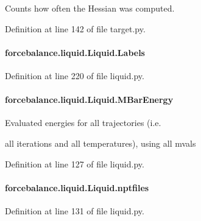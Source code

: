 Counts how often the Hessian was computed. 



Definition at line 142 of file target.\-py.

\hypertarget{classforcebalance_1_1liquid_1_1Liquid_a50f976d2d3d6a1c261756035a26390e2}{
\paragraph[{Labels}]{\setlength{\rightskip}{0pt plus 5cm}forcebalance.\-liquid.\-Liquid.\-Labels}}\label{classforcebalance_1_1liquid_1_1Liquid_a50f976d2d3d6a1c261756035a26390e2}


Definition at line 220 of file liquid.\-py.

\hypertarget{classforcebalance_1_1liquid_1_1Liquid_a6c00a87ae43f535118b77d41af51a5d7}{
\paragraph[{M\-Bar\-Energy}]{\setlength{\rightskip}{0pt plus 5cm}forcebalance.\-liquid.\-Liquid.\-M\-Bar\-Energy}}\label{classforcebalance_1_1liquid_1_1Liquid_a6c00a87ae43f535118b77d41af51a5d7}


Evaluated energies for all trajectories (i.\-e. 

all iterations and all temperatures), using all mvals 

Definition at line 127 of file liquid.\-py.

\hypertarget{classforcebalance_1_1liquid_1_1Liquid_a2030a7e21fcce59155a0258daed4f2f7}{
\paragraph[{nptfiles}]{\setlength{\rightskip}{0pt plus 5cm}forcebalance.\-liquid.\-Liquid.\-nptfiles}}\label{classforcebalance_1_1liquid_1_1Liquid_a2030a7e21fcce59155a0258daed4f2f7}


Definition at line 131 of file liquid.\-py.

